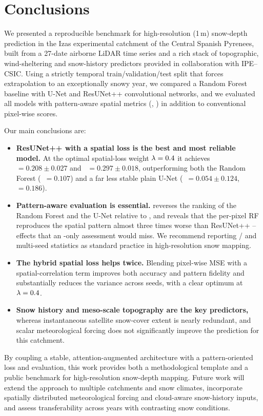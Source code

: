 \section{Conclusions}
\label{sec:conclusions}

We presented a reproducible benchmark for high-resolution (1\,m) snow-depth
prediction in the Izas experimental catchment of the Central Spanish Pyrenees,
built from a 27-date airborne LiDAR time series and a rich stack of
topographic, wind-sheltering and snow-history predictors provided in
collaboration with IPE--CSIC. Using a strictly temporal train/validation/test
split that forces extrapolation to an exceptionally snowy year, we compared a
Random Forest baseline with U-Net and ResUNet++ convolutional networks, and we
evaluated all models with pattern-aware spatial metrics (\SPAEF{}, \MSPAEF{})
in addition to conventional pixel-wise scores.

Our main conclusions are:

\begin{itemize}
  \item \textbf{ResUNet++ with a spatial loss is the best and most reliable
  model.} At the optimal spatial-loss weight $\lambda=0.4$ it achieves
  \Rsq{}~$=0.208\pm0.027$ and \SPAEF{}~$=0.297\pm0.018$, outperforming both the
  Random Forest (\SPAEF{}~$=0.107$) and a far less stable plain U-Net
  (\Rsq{}~$=0.054\pm0.124$, \SPAEF{}~$=0.186$).

  \item \textbf{Pattern-aware evaluation is essential.} \SPAEF{} reverses the
  ranking of the Random Forest and the U-Net relative to \Rsq{}, and reveals
  that the per-pixel RF reproduces the spatial pattern almost three times worse
  than ResUNet++ -- effects that an \Rsq{}-only assessment would miss. We
  recommend reporting \SPAEF{}/\MSPAEF{} and multi-seed statistics as standard
  practice in high-resolution snow mapping.

  \item \textbf{The hybrid spatial loss helps twice.} Blending pixel-wise MSE
  with a spatial-correlation term improves both accuracy and pattern fidelity
  and substantially reduces the variance across seeds, with a clear optimum at
  $\lambda=0.4$.

  \item \textbf{Snow history and meso-scale topography are the key
  predictors,} whereas instantaneous satellite snow-cover extent is nearly
  redundant, and scalar meteorological forcing does not significantly improve
  the prediction for this catchment.
\end{itemize}

By coupling a stable, attention-augmented architecture with a pattern-oriented
loss and evaluation, this work provides both a methodological template and a
public benchmark for high-resolution snow-depth mapping. Future work will
extend the approach to multiple catchments and snow climates, incorporate
spatially distributed meteorological forcing and cloud-aware snow-history
inputs, and assess transferability across years with contrasting snow
conditions.
